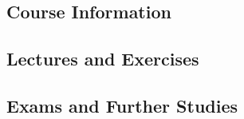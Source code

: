 \subsection{Course Information}

\subsection{Lectures and Exercises}

\subsection{Exams and Further Studies}


